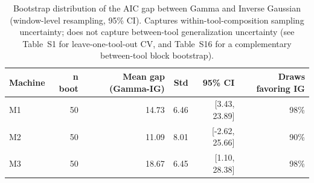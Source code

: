 \begin{table}[t]
\centering
\caption{Bootstrap distribution of the AIC gap between Gamma and Inverse Gaussian (window-level resampling, 95\% CI). Captures within-tool-composition sampling uncertainty; does not capture between-tool generalization uncertainty (see Table~S1 for leave-one-tool-out CV, and Table~S16 for a complementary between-tool block bootstrap).}
\label{tab:bootstrap-aic-gap}
\begin{tabular}{lrrrrr}
\toprule
Machine & n boot & Mean gap (Gamma-IG) & Std & 95\% CI & Draws favoring IG \\
\midrule
M1 & 50 & 14.73 & 6.46 & [3.43, 23.89] & 98\% \\
M2 & 50 & 11.09 & 8.01 & [-2.62, 25.66] & 90\% \\
M3 & 50 & 18.67 & 6.45 & [1.10, 28.38] & 98\% \\
\bottomrule
\end{tabular}
\end{table}
